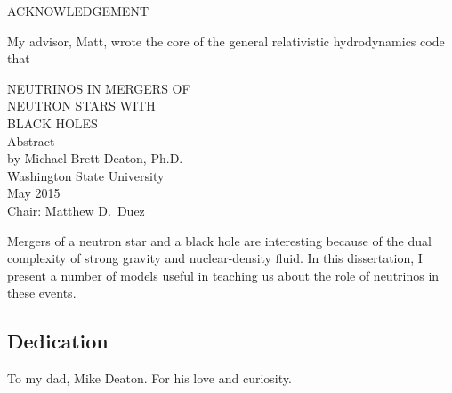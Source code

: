 \documentclass[12pt]{report}
\begin{document}
\begin{center}
  \uppercase{Acknowledgement}
  
  My advisor, Matt, wrote the core of the general relativistic hydrodynamics code
  that
\end{center}
\newpage

\begin{center}
  \begin{singlespace}
    \label{ssec:abstract}

    {\uppercase{
        Neutrinos in Mergers of\\
        Neutron Stars with\\
        Black Holes}}\\
    \bigskip
    Abstract\\
    \bigskip \bigskip \bigskip
    by Michael Brett Deaton, Ph.D.\\
    Washington State University\\
    May 2015\\
    \bigskip \bigskip \bigskip
    Chair: Matthew D.\ Duez
  \end{singlespace}
\end{center}
  
Mergers of a neutron star and a black hole are interesting because of the dual
complexity of strong gravity and nuclear-density fluid. In this dissertation,
I present a number of models useful in teaching us about the role of neutrinos
in these events.
\newpage

\tableofcontents
\newpage

\listoftables
\newpage

\listoffigures
\newpage

\begin{center}
  \subsection*{Dedication}
  To my dad, Mike Deaton. For his love and curiosity.
  \newpage
\end{center}


\newpage


\end{document}
